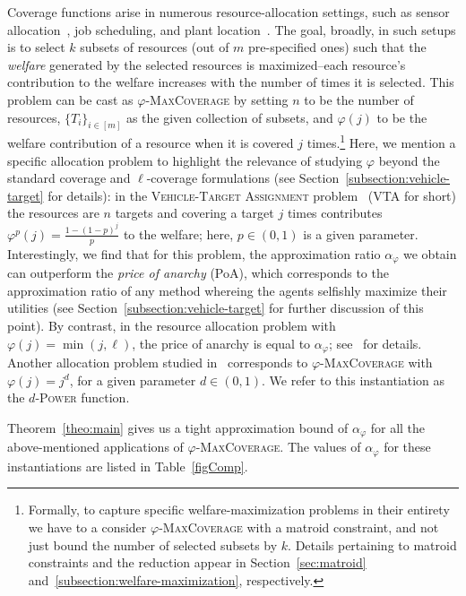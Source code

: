 Coverage functions arise in numerous resource-allocation settings, such as sensor allocation~\cite{MW08}, job scheduling, and plant location~\cite{CFN77}. The goal, broadly, in such setups is to select $k$ subsets of resources (out of $m$ pre-specified ones) such that the \emph{welfare} generated by the selected resources is maximized--each resource's contribution to the welfare increases with the number of times it is selected. This problem can be cast as $\varphi$-\textsc{MaxCoverage} by setting $n$ to be the number of resources, $\{T_i\}_{i\in [m]}$ as the given collection of subsets, and $\varphi(j)$ to be the welfare contribution of a resource when it is covered $j$ times.\footnote{Formally, to capture specific welfare-maximization problems in their entirety we have to a consider $\varphi$-\textsc{MaxCoverage} with a matroid constraint, and not just bound the number of selected subsets by $k$. Details pertaining to matroid constraints and the reduction appear in Section~\ref{sec:matroid} and~\ref{subsection:welfare-maximization}, respectively.}  Here, we mention a specific allocation problem to highlight the relevance of studying $\varphi$ beyond the standard coverage and $\ell$-coverage formulations (see Section~\ref{subsection:vehicle-target} for details): in the \textsc{Vehicle-Target Assignment} problem~\cite{Murphey00,PM19} (\textsc{VTA} for short) the resources are $n$ targets and covering a target $j$ times contributes $\varphi^p(j) = \frac{1-(1-p)^j}{p}$ to the welfare; here, $p \in (0,1)$ is a given parameter. Interestingly, we find that for this problem, the approximation ratio $\alpha_{\varphi}$ we obtain can outperform the \emph{price of anarchy} (PoA), which corresponds to the approximation ratio of any method whereing the agents selfishly maximize their utilities (see Section~\ref{subsection:vehicle-target} for further discussion of this point). By contrast, in the resource allocation problem with $\varphi(j) = \min(j, \ell)$, the price of anarchy is equal to $\alpha_{\varphi}$; see~\cite{CPM19} for details. Another allocation problem studied in~\cite{PM19} corresponds to $\varphi$-\textsc{MaxCoverage} with $\varphi(j) = j^d$, for a given parameter $d \in (0,1)$. We refer to this instantiation as the $d$-\textsc{Power} function. 

Theorem~\ref{theo:main} gives us a tight approximation bound of $\alpha_{\varphi}$ for all the above-mentioned applications of $\varphi$-\textsc{MaxCoverage}. The values of $\alpha_{\varphi}$ for these instantiations are listed in Table~\ref{figComp}. 


